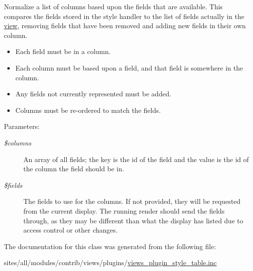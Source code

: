 Normalize a list of columns based upon the fields that are available. This compares the fields stored in the style handler to the list of fields actually in the \hyperlink{classview}{view}, removing fields that have been removed and adding new fields in their own column.

\begin{itemize}
\item Each field must be in a column.\item Each column must be based upon a field, and that field is somewhere in the column.\item Any fields not currently represented must be added.\item Columns must be re-ordered to match the fields.\end{itemize}


\begin{Desc}
\item[Parameters:]
\begin{description}
\item[{\em \$columns}]An array of all fields; the key is the id of the field and the value is the id of the column the field should be in. \item[{\em \$fields}]The fields to use for the columns. If not provided, they will be requested from the current display. The running render should send the fields through, as they may be different than what the display has listed due to access control or other changes. \end{description}
\end{Desc}


The documentation for this class was generated from the following file:\begin{CompactItemize}
\item 
sites/all/modules/contrib/views/plugins/\hyperlink{views__plugin__style__table_8inc}{views\_\-plugin\_\-style\_\-table.inc}\end{CompactItemize}
